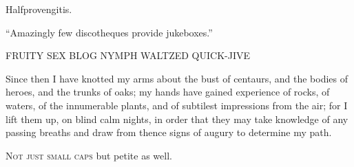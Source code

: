 \documentclass[a4paper,14pt]{memoir}
\title{}
\author{}
\date{}
\begin{document}
	\pagestyle{empty}
{
\raggedright
Halfprovengitis.

``Amazingly few discotheques provide jukeboxes.''

{FRUITY SEX BLOG NYMPH WALTZED QUICK-JIVE}

{\quotation
Since then I have knotted my arms about the bust of centaurs, and the bodies of heroes, and the trunks of oaks; my
hands have gained experience of rocks, of waters, of the innumerable plants, and of subtilest impressions from the air;
for I lift them up, on blind calm nights, in order that they may take knowledge of any passing breaths and draw from
thence signs of augury to determine my path.
}

\bigskip

\textsc{Not just small caps} but {petite as well}.

}
\end{document}
